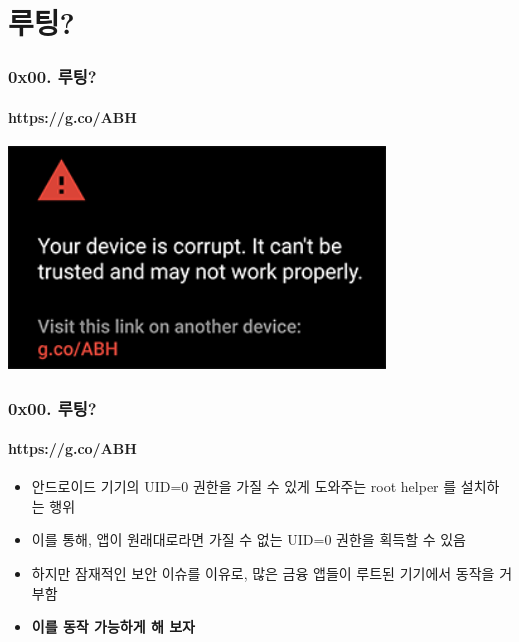 
\begin{frame}
  \titlepage
\end{frame}

\usebackgroundtemplate{}

\section[Section]{루팅?}
\begin{frame}
  \frametitle{0x00. 루팅?}
  \framesubtitle{https://g.co/ABH}

  \begin{center}
    \includegraphics [width=100mm]{img/corrupted_nexus.png}
  \end{center}
\end{frame}

\begin{frame}
  \frametitle{0x00. 루팅?}
  \framesubtitle{https://g.co/ABH}

  \begin{itemize}
  \item 안드로이드 기기의 UID=0 권한을 가질 수 있게 도와주는 root helper 를 설치하는 행위
  \item<2-> 이를 통해, 앱이 원래대로라면 가질 수 없는 UID=0 권한을 획득할 수 있음
  \item<3-> 하지만 잠재적인 보안 이슈를 이유로, 많은 금융 앱들이 루트된 기기에서 동작을 거부함
  \item<4-> \textbf{이를 동작 가능하게 해 보자}
  \end{itemize}
\end{frame}
 
